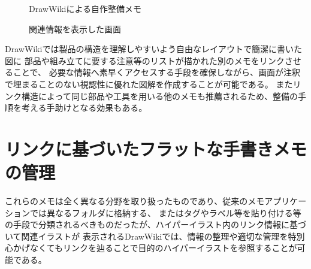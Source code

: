 \begin{figure}[H] \begin{minipage}{0.5\hsize}
                      \begin{center} 
                      \end{center} \caption{DrawWikiによる自作整備メモ} \label{fig:oremanual1}
\end{minipage} \begin{minipage}{0.5\hsize}
                   \begin{center} 
                   \end{center} \caption{関連情報を表示した画面} \label{fig:oremanual2}
\end{minipage}
\end{figure}

DrawWikiでは製品の構造を理解しやすいよう自由なレイアウトで簡潔に書いた図に 部品や組み立てに要する注意等のリストが描かれた別のメモをリンクさせることで、
必要な情報へ素早くアクセスする手段を確保しながら、画面が注釈で埋まることのない視認性に優れた図解を作成することが可能である。
またリンク構造によって同じ部品や工具を用いる他のメモも推薦されるため、整備の手順を考える手助けとなる効果もある。

\section{リンクに基づいたフラットな手書きメモの管理}
これらのメモは全く異なる分野を取り扱ったものであり、従来のメモアプリケーションでは異なるフォルダに格納する、
またはタグやラベル等を貼り付ける等の手段で分類されるべきものだったが、ハイパーイラスト内のリンク情報に基づいて関連イラストが
表示されるDrawWikiでは、情報の整理や適切な管理を特別心かげなくてもリンクを辿ることで目的のハイパーイラストを参照することが可能である。

